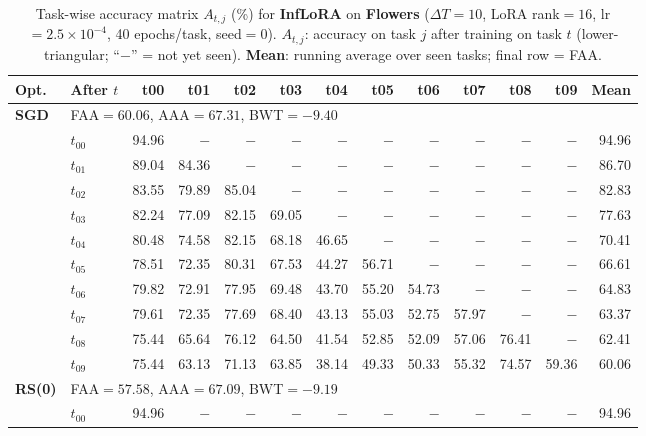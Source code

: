 \begin{table}[ht]
\centering
\caption{%
  Task-wise accuracy matrix $A_{t,j}$ (\%) for \textbf{InfLoRA} on \textbf{Flowers} ($\Delta T=10$, LoRA rank$=16$, lr$=2.5\times10^{-4}$, 40 epochs/task, seed$=0$).
  $A_{t,j}$: accuracy on task $j$ after training on task $t$  (lower-triangular; ``$-$'' = not yet seen).
  \textbf{Mean}: running average over seen tasks; final row = FAA.
}
\label{tab:raw_inflora_flowers}
\setlength{\tabcolsep}{2.8pt}
\renewcommand{\arraystretch}{0.88}
\scriptsize
\begin{tabular}{@{}l l r r r r r r r r r r r@{}}
\toprule
\textbf{Opt.} & \textbf{After $t$} & \textbf{t00} & \textbf{t01} & \textbf{t02} & \textbf{t03} & \textbf{t04} & \textbf{t05} & \textbf{t06} & \textbf{t07} & \textbf{t08} & \textbf{t09} & \textbf{Mean} \\
\midrule
\multirow{11}{*}{\textbf{SGD}} & \multicolumn{12}{l}{\quad\small FAA$=60.06$,\; AAA$=67.31$,\; BWT$=-9.40$} \\
 & $t_{00}$ & 94.96 & $-$ & $-$ & $-$ & $-$ & $-$ & $-$ & $-$ & $-$ & $-$ & 94.96 \\
 & $t_{01}$ & 89.04 & 84.36 & $-$ & $-$ & $-$ & $-$ & $-$ & $-$ & $-$ & $-$ & 86.70 \\
 & $t_{02}$ & 83.55 & 79.89 & 85.04 & $-$ & $-$ & $-$ & $-$ & $-$ & $-$ & $-$ & 82.83 \\
 & $t_{03}$ & 82.24 & 77.09 & 82.15 & 69.05 & $-$ & $-$ & $-$ & $-$ & $-$ & $-$ & 77.63 \\
 & $t_{04}$ & 80.48 & 74.58 & 82.15 & 68.18 & 46.65 & $-$ & $-$ & $-$ & $-$ & $-$ & 70.41 \\
 & $t_{05}$ & 78.51 & 72.35 & 80.31 & 67.53 & 44.27 & 56.71 & $-$ & $-$ & $-$ & $-$ & 66.61 \\
 & $t_{06}$ & 79.82 & 72.91 & 77.95 & 69.48 & 43.70 & 55.20 & 54.73 & $-$ & $-$ & $-$ & 64.83 \\
 & $t_{07}$ & 79.61 & 72.35 & 77.69 & 68.40 & 43.13 & 55.03 & 52.75 & 57.97 & $-$ & $-$ & 63.37 \\
 & $t_{08}$ & 75.44 & 65.64 & 76.12 & 64.50 & 41.54 & 52.85 & 52.09 & 57.06 & 76.41 & $-$ & 62.41 \\
 & $t_{09}$ & 75.44 & 63.13 & 71.13 & 63.85 & 38.14 & 49.33 & 50.33 & 55.32 & 74.57 & 59.36 & 60.06 \\
\midrule
\multirow{11}{*}{\textbf{RS(0)}} & \multicolumn{12}{l}{\quad\small FAA$=57.58$,\; AAA$=67.09$,\; BWT$=-9.19$} \\
 & $t_{00}$ & 94.96 & $-$ & $-$ & $-$ & $-$ & $-$ & $-$ & $-$ & $-$ & $-$ & 94.96 \\

\end{tabular}
\end{table}
